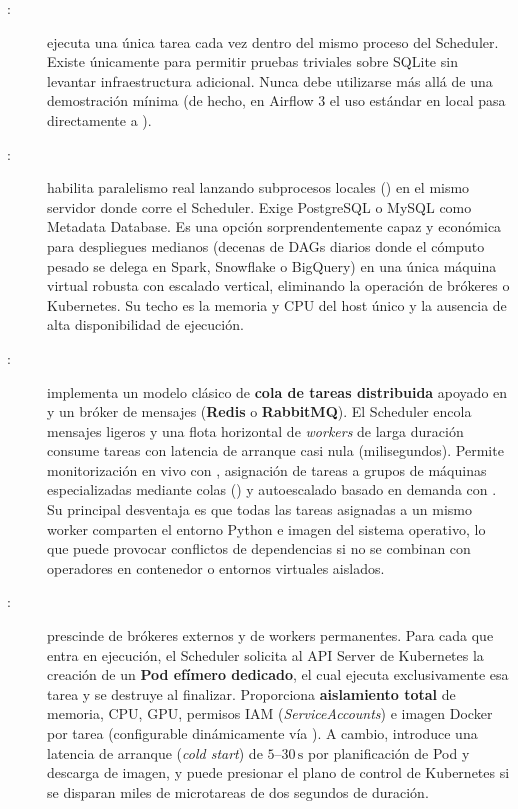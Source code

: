 \begin{description}
  \item[:] ejecuta una única tarea cada vez dentro del mismo proceso del Scheduler. Existe únicamente para permitir pruebas triviales sobre SQLite sin levantar infraestructura adicional. Nunca debe utilizarse más allá de una demostración mínima (de hecho, en Airflow 3 el uso estándar en local pasa directamente a ).

  \item[:] habilita paralelismo real lanzando subprocesos locales () en el mismo servidor donde corre el Scheduler. Exige PostgreSQL o MySQL como Metadata Database. Es una opción sorprendentemente capaz y económica para despliegues medianos (decenas de DAGs diarios donde el cómputo pesado se delega en Spark, Snowflake o BigQuery) en una única máquina virtual robusta con escalado vertical, eliminando la operación de brókeres o Kubernetes. Su techo es la memoria y CPU del host único y la ausencia de alta disponibilidad de ejecución.

  \item[:] implementa un modelo clásico de \textbf{cola de tareas distribuida} apoyado en  y un bróker de mensajes (\textbf{Redis} o \textbf{RabbitMQ}). El Scheduler encola mensajes ligeros y una flota horizontal de \textit{workers} de larga duración consume tareas con latencia de arranque casi nula (milisegundos). Permite monitorización en vivo con , asignación de tareas a grupos de máquinas especializadas mediante colas () y autoescalado basado en demanda con . Su principal desventaja es que todas las tareas asignadas a un mismo worker comparten el entorno Python e imagen del sistema operativo, lo que puede provocar conflictos de dependencias si no se combinan con operadores en contenedor o entornos virtuales aislados.

  \item[:] prescinde de brókeres externos y de workers permanentes. Para cada  que entra en ejecución, el Scheduler solicita al API Server de Kubernetes la creación de un \textbf{Pod efímero dedicado}, el cual ejecuta exclusivamente esa tarea y se destruye al finalizar. Proporciona \textbf{aislamiento total} de memoria, CPU, GPU, permisos IAM (\textit{ServiceAccounts}) e imagen Docker por tarea (configurable dinámicamente vía ). A cambio, introduce una latencia de arranque (\textit{cold start}) de $5\text{--}30\,\text{s}$ por planificación de Pod y descarga de imagen, y puede presionar el plano de control de Kubernetes si se disparan miles de microtareas de dos segundos de duración.


\end{description}
